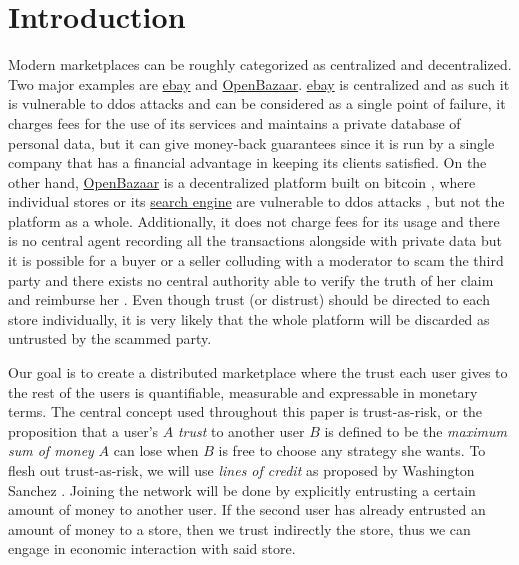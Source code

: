\documentclass[11pt]{article}
\theoremstyle{definition}
\theoremstyle{corollary}
\theoremstyle{lemma}
\begin{document}
  \section{Introduction}
     Modern marketplaces can be roughly categorized as centralized and decentralized. Two major examples are
     \href{http://www.ebay.com}{ebay} and \href{https://openbazaar.org/}{OpenBazaar}. \href{http://www.ebay.com}{ebay} is
     centralized and as such it is vulnerable to ddos attacks \cite{ddosattacks} and can be considered as a single point of
     failure, it charges fees for the use of its services \cite{ebayfees} and maintains a private database of personal data,
     but it can give money-back guarantees \cite{ebayguarantee} since it is run by a single company that has a financial
     advantage in keeping its clients satisfied. On the other hand, \href{https://openbazaar.org/}{OpenBazaar} is a
     decentralized platform built on bitcoin \cite{bitcoin}, where individual stores or its \href{https://duosear.ch}{search
     engine} are vulnerable to ddos attacks \cite{ddosattacks}, but not the platform as a whole. Additionally, it does not
     charge fees for its usage \cite{openbazaar} and there is no central agent recording all the transactions alongside with
     private data \cite{openbazaar} but it is possible for a buyer or a seller colluding with a  moderator to scam the third
     party and there exists no central authority able to verify the truth of her claim and reimburse her
     \cite{multisigfraud}. Even though trust (or distrust) should be directed to each store individually, it is very likely
     that the whole platform will be discarded as untrusted by the scammed party.

     Our goal is to create a distributed marketplace where the trust each user gives to the rest of the users is
     quantifiable, measurable and expressable in monetary terms. The central concept used throughout this paper is
     trust-as-risk, or the proposition that a user's $A$ \textit{trust} to another user $B$ is defined to be the
     \textit{maximum sum of money} $A$ can lose when $B$ is free to choose any strategy she wants. To flesh out
     trust-as-risk, we will use \textit{lines of credit} as proposed by Washington Sanchez \cite{loc}. Joining the network
     will be done by explicitly entrusting a certain amount of money to another user. If the second user has already
     entrusted an amount of money to a store, then we trust indirectly the store, thus we can engage in economic interaction
     with said store.
\end{document}
